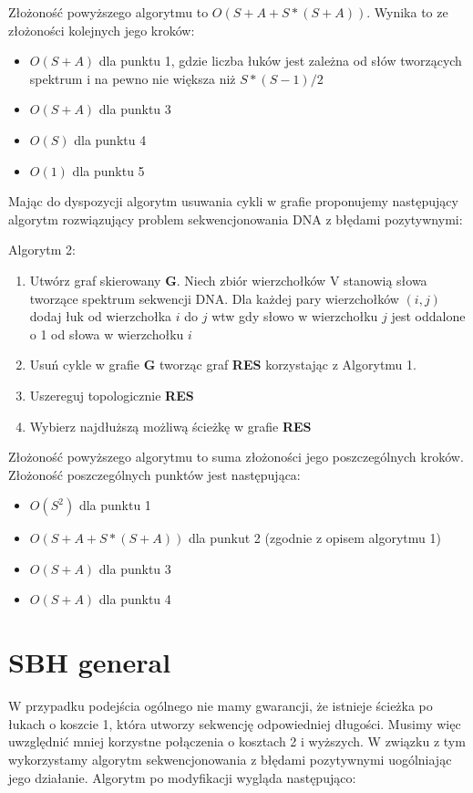 \documentclass[a4paper,10pt]{article}
\begin{document}
Złożoność powyższego algorytmu to $O(S + A + S * (S + A))$. Wynika to ze złożoności kolejnych jego kroków:
\begin{itemize}
 \item $O(S + A)$ dla punktu 1, gdzie liczba łuków jest zależna od słów tworzących spektrum i na pewno nie większa niż $S * (S-1) / 2$
 \item $O(S + A)$ dla punktu 3
 \item $O(S)$ dla punktu 4
 \item $O(1)$ dla punktu 5
\end{itemize}

Mając do dyspozycji algorytm usuwania cykli w grafie proponujemy następujący algorytm rozwiązujący problem sekwencjonowania DNA z błędami pozytywnymi:

Algorytm 2:
\begin{enumerate}
 \item Utwórz graf skierowany {\bf G}. Niech zbiór wierzchołków V stanowią słowa tworzące spektrum sekwencji DNA. Dla każdej pary wierzchołków $(i,j)$ dodaj łuk od wierzchołka $i$ do $j$ wtw gdy słowo w wierzchołku $j$ jest oddalone o 1 od słowa w wierzchołku $i$
 \item Usuń cykle w grafie {\bf G} tworząc graf {\bf RES} korzystając z Algorytmu 1.
 \item Uszereguj topologicznie {\bf RES}
 \item Wybierz najdłuższą możliwą ścieżkę w grafie {\bf RES}
\end{enumerate}

Złożoność powyższego algorytmu to suma złożoności jego poszczególnych kroków. Złożoność poszczególnych punktów jest następująca:
\begin{itemize}
 \item $O(S^2)$ dla punktu 1
 \item $O(S + A + S * (S + A))$ dla punkut 2 (zgodnie z opisem algorytmu 1)
 \item $O(S + A)$ dla punktu 3
 \item $O(S + A)$ dla punktu 4
\end{itemize}

\section{SBH general}
W przypadku podejścia ogólnego nie mamy gwarancji, że istnieje ścieżka po łukach o koszcie 1, która utworzy sekwencję odpowiedniej długości. Musimy więc uwzględnić mniej korzystne połączenia o kosztach 2 i wyższych. W związku z tym wykorzystamy algorytm sekwencjonowania z błędami pozytywnymi uogólniając jego działanie. Algorytm po modyfikacji wygląda następująco:
\end{document}
